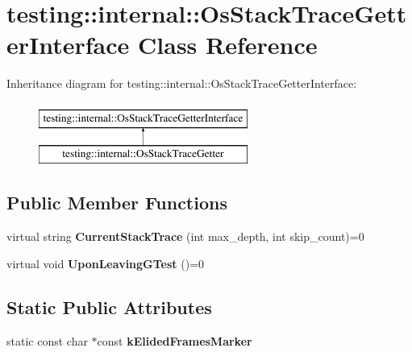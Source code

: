 \hypertarget{classtesting_1_1internal_1_1_os_stack_trace_getter_interface}{}\section{testing\+:\+:internal\+:\+:Os\+Stack\+Trace\+Getter\+Interface Class Reference}
\label{classtesting_1_1internal_1_1_os_stack_trace_getter_interface}
Inheritance diagram for testing\+:\+:internal\+:\+:Os\+Stack\+Trace\+Getter\+Interface\+:\begin{figure}[H]
\begin{center}
\leavevmode
\includegraphics[height=2.000000cm]{classtesting_1_1internal_1_1_os_stack_trace_getter_interface}
\end{center}
\end{figure}
\subsection*{Public Member Functions}
\begin{DoxyCompactItemize}
\item 
\mbox{\label{classtesting_1_1internal_1_1_os_stack_trace_getter_interface_a6965eadb9b340808718fab9f1475c49a}} 
virtual string {\bfseries Current\+Stack\+Trace} (int max\+\_\+depth, int skip\+\_\+count)=0
\item 
\mbox{\label{classtesting_1_1internal_1_1_os_stack_trace_getter_interface_a791bd120428b5a53d5eeba1b27296a39}} 
virtual void {\bfseries Upon\+Leaving\+G\+Test} ()=0
\end{DoxyCompactItemize}
\subsection*{Static Public Attributes}
\begin{DoxyCompactItemize}
\item 
static const char $\ast$const {\bfseries k\+Elided\+Frames\+Marker}
\end{DoxyCompactItemize}


